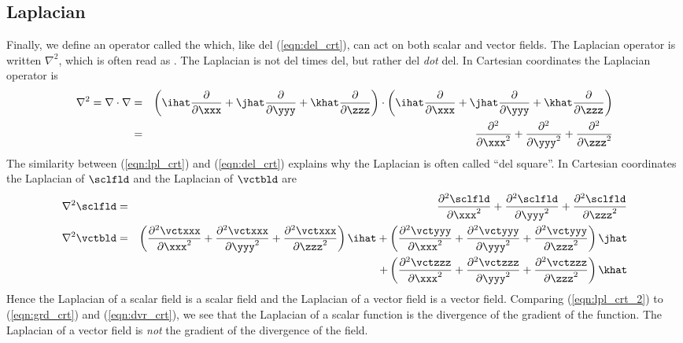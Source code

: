 \documentclass[12pt,twoside]{book}
\begin{document}
\subsection[Laplacian]{Laplacian}\label{sxn:lpl_crt}
Finally, we define an operator called the  which,
like del (\ref{eqn:del_crt}), can act on both scalar and vector
fields. 
The Laplacian operator is written $\nabla^{2}$, which is often read
as . 
The Laplacian is not del times del, but rather
del \textit{dot} del. 
In Cartesian coordinates the Laplacian operator is
\begin{eqnarray}
\nabla^{2} = \nabla \cdot \nabla & = &
\left( \ihat \frac{\partial}{\partial \xxx} + 
\jhat \frac{\partial}{\partial \yyy} + 
\khat \frac{\partial}{\partial \zzz} \right)
\cdot
\left( \ihat \frac{\partial}{\partial \xxx} + 
\jhat \frac{\partial}{\partial \yyy} + 
\khat \frac{\partial}{\partial \zzz} \right)
\nonumber \\
& = &
\frac{\partial^{2}}{\partial \xxx^{2}} + 
\frac{\partial^{2}}{\partial \yyy^{2}} + 
\frac{\partial^{2}}{\partial \zzz^{2}}
\label{eqn:lpl_crt}
\end{eqnarray}
The similarity between (\ref{eqn:lpl_crt}) and (\ref{eqn:del_crt})
explains why the Laplacian is often called ``del square''.
In Cartesian coordinates the Laplacian of $\sclfld$ and the Laplacian
of $\vctbld$ are 
\begin{eqnarray}
\nabla^{2} \sclfld & = &
\frac{\partial^{2} \sclfld}{\partial \xxx^{2}} + 
\frac{\partial^{2} \sclfld}{\partial \yyy^{2}} + 
\frac{\partial^{2} \sclfld}{\partial \zzz^{2}} \\
\nabla^{2} \vctbld & = & 
\left( 
\frac{\partial^{2} \vctxxx}{\partial \xxx^{2}} +
\frac{\partial^{2} \vctxxx}{\partial \yyy^{2}} +
\frac{\partial^{2} \vctxxx}{\partial \zzz^{2}} 
\right) \ihat + 
\left( 
\frac{\partial^{2} \vctyyy}{\partial \xxx^{2}} +
\frac{\partial^{2} \vctyyy}{\partial \yyy^{2}} +
\frac{\partial^{2} \vctyyy}{\partial \zzz^{2}} 
\right) \jhat \nonumber \\
& & + \left( 
\frac{\partial^{2} \vctzzz}{\partial \xxx^{2}} +
\frac{\partial^{2} \vctzzz}{\partial \yyy^{2}} +
\frac{\partial^{2} \vctzzz}{\partial \zzz^{2}} 
\right) \khat
\label{eqn:lpl_crt_2}
\end{eqnarray}
Hence the Laplacian of a scalar field is a scalar field and 
the Laplacian of a vector field is a vector field.
Comparing (\ref{eqn:lpl_crt_2}) to (\ref{eqn:grd_crt}) and
(\ref{eqn:dvr_crt}), we see that the Laplacian of a scalar function is
the divergence of the gradient of the function. %
The Laplacian of a vector field is \textit{not} the gradient 
of the divergence of the field. 
\end{document}
